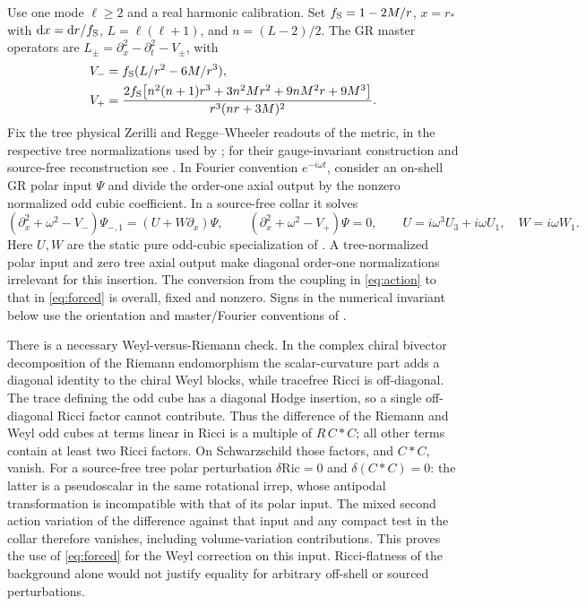 \documentclass[11pt]{article}
\newcommand{\dd}{\mathrm d}
\begin{document}
Use one mode \(\ell\ge2\) and a real harmonic calibration. Set \(f_{\rm S}=1-2M/r\), \(x=r_*\) with \(\dd x=\dd r/f_{\rm S}\), \(L=\ell(\ell+1)\), and \(n=(L-2)/2\). The GR master operators are \(L_\pm=\partial_x^2-\partial_t^2-V_\pm\), with
\begin{align*}
 V_-&=f_{\rm S}(L/r^2-6M/r^3),\\
 V_+&=\frac{2f_{\rm S}\big[n^2(n+1)r^3+3n^2Mr^2+9nM^2r+9M^3\big]}
                    {r^3(nr+3M)^2}.
\end{align*}
Fix the tree physical Zerilli and Regge--Wheeler readouts of the metric, in the respective tree normalizations used by \cite[eqs.~(40),(45)]{Cano}; for their gauge-invariant construction and source-free reconstruction see \cite{Moncrief,MartelPoisson}. In Fourier convention \(e^{-i\omega t}\), consider an on-shell GR polar input \(\Psi\) and divide the order-one axial output by the nonzero normalized odd cubic coefficient. In a source-free collar it solves
\begin{equation}
 (\partial_x^2+\omega^2-V_-)\Psi_{-,1}=(U+W\partial_x)\Psi,\qquad
 (\partial_x^2+\omega^2-V_+)\Psi=0,\qquad
 U=i\omega^3 U_3+i\omega U_1,\quad W=i\omega W_1 .
 \label{eq:forced}
\end{equation}
Here \(U,W\) are the static pure odd-cubic specialization of \cite[eqs.~(49)--(52), App.~C (C17),(C19)]{Cano}. A tree-normalized polar input and zero tree axial output make diagonal order-one normalizations irrelevant for this insertion. The conversion from the coupling in \eqref{eq:action} to that in \eqref{eq:forced} is overall, fixed and nonzero. Signs in the numerical invariant below use the orientation and master/Fourier conventions of \cite{Cano}.

There is a necessary Weyl-versus-Riemann check. In the complex chiral bivector decomposition of the Riemann endomorphism the scalar-curvature part adds a diagonal identity to the chiral Weyl blocks, while tracefree Ricci is off-diagonal. The trace defining the odd cube has a diagonal Hodge insertion, so a single off-diagonal Ricci factor cannot contribute. Thus the difference of the Riemann and Weyl odd cubes at terms linear in Ricci is a multiple of \(R\, C{*}C\); all other terms contain at least two Ricci factors. On Schwarzschild those factors, and \(C{*}C\), vanish. For a source-free tree polar perturbation \(\delta\mathrm{Ric}=0\) and \(\delta(C{*}C)=0\): the latter is a pseudoscalar in the same rotational irrep, whose antipodal transformation is incompatible with that of its polar input. The mixed second action variation of the difference against that input and any compact test in the collar therefore vanishes, including volume-variation contributions. This proves the use of \eqref{eq:forced} for the Weyl correction on this input. Ricci-flatness of the background alone would not justify equality for arbitrary off-shell or sourced perturbations.
\end{document}

